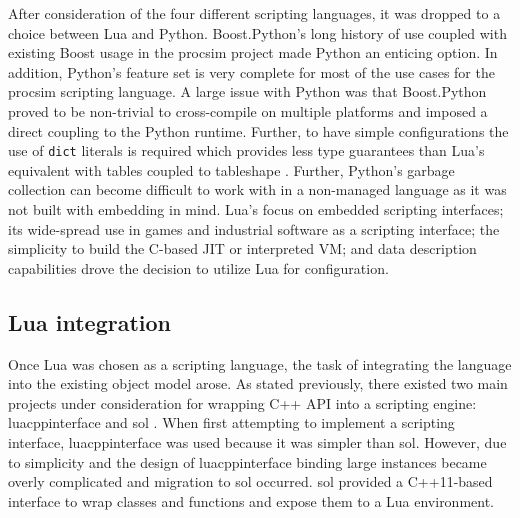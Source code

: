 After consideration of the four different scripting languages, it was dropped to a choice between Lua and Python. Boost.Python's long history of use coupled with existing Boost usage in the procsim project made Python an enticing option. In addition, Python's feature set is very complete for most of the use cases for the procsim scripting language. A large issue with Python was that Boost.Python proved to be non-trivial to cross-compile on multiple platforms and imposed a direct coupling to the Python runtime. Further, to have simple configurations the use of \texttt{dict} literals is required which provides less type guarantees than Lua's equivalent with tables coupled to tableshape \cite{Python:BuiltinTypes, Ierusalimschy:PIL, Github:leafto:tableshape}. Further, Python's garbage collection can become difficult to work with in a non-managed language as it was not built with embedding in mind. Lua's focus on embedded scripting interfaces; its wide-spread use in games and industrial software as a scripting interface; the simplicity to build the C-based JIT or interpreted VM; and data description capabilities drove the decision to utilize Lua for configuration. 

\subsection{Lua integration}

Once Lua was chosen as a scripting language, the task of integrating the language into the existing object model arose. As stated previously, there existed two main projects under consideration for wrapping C++ API into a scripting engine: luacppinterface \cite{Github:davidsiaw:luacppinterface} and sol \cite{Github:Rapptz:Sol}. When first attempting to implement a scripting interface, luacppinterface was used because it was simpler than sol. However, due to simplicity and the design of luacppinterface binding large  instances became overly complicated and migration to sol occurred. sol provided a C++11-based interface to wrap classes and functions and expose them to a Lua environment.

